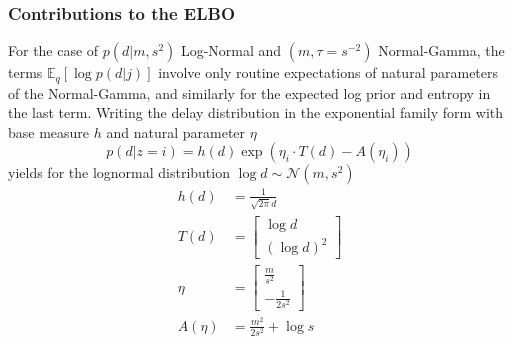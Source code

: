 \documentclass[10pt,letterpaper]{article}
\begin{document}
\subsubsection{Contributions to the ELBO}
For the case of $p(d|m, s^2)$ Log-Normal and $(m, \tau = s^{-2})$ Normal-Gamma, the terms $\mathbb{E}_q[\log p(d|j)]$ involve only routine expectations of natural parameters of the Normal-Gamma, and similarly for the expected log prior and entropy in the last term. Writing the delay distribution in the exponential family form with base measure $h$ and natural parameter $\eta$
\begin{equation}
    p(d|z=i) = h(d) \exp(\eta_i \cdot T(d) - A(\eta_i))
\end{equation}
yields for the lognormal distribution $\log d \sim \mathcal{N}(m, s^2)$
\begin{align}
    h(d) &= \frac{1}{\sqrt{2\pi} d} \\
    T(d) &= \begin{bmatrix}
    \log d \\
    (\log d) ^2
    \end{bmatrix} \\
    \eta &= \begin{bmatrix}
    \frac{m}{s^2} \\
    -\frac{1}{2s^2}
    \end{bmatrix} \\
    A(\eta) &= \frac{m^2}{2s^2} + \log s
\end{align}
\end{document}
